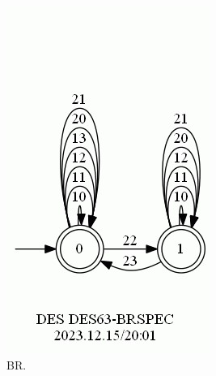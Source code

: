 \documentclass{article}
\begin{document}
\begin{figure}[h!]
\begin{subfigure}{0.2\linewidth}
    \includegraphics[width=\linewidth]{assets/DES63-BRSPEC.jpg}
    \caption{BR.}
  \end{subfigure}
  \begin{subfigure}{0.5\linewidth}

\end{subfigure}
\end{figure}
\end{document}

